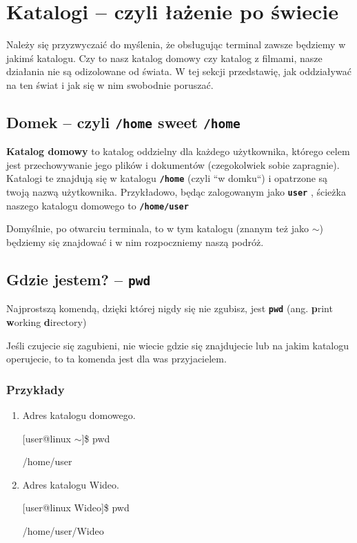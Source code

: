 \documentclass[11pt, a4paper]{article}
\makeatletter
\newcommand{\ttbf}[1]{
    \texttt{\textbf{#1}}
}
\newenvironment{console1}[1][$\sim$]
{
    \begin{tcolorbox}
    \ttfamily
    \fontseries{b}
    \selectfont
    {[}user@linux #1{]}\$ } {
    
    \end{tcolorbox}

}
\makeatother
\begin{document}
\section{Katalogi -- czyli łażenie po świecie}

Należy się przyzwyczaić do myślenia, że obsługując terminal zawsze będziemy w jakimś katalogu. Czy to nasz katalog domowy czy katalog z filmami, nasze działania nie są odizolowane od świata. W tej sekcji przedstawię, jak oddziaływać na ten świat i jak się w nim swobodnie poruszać.

\subsection{Domek -- czyli \ttbf{/home} sweet \ttbf{/home}}
\label{sec:homedir}

\textbf{Katalog domowy} to katalog oddzielny dla każdego użytkownika, którego celem jest przechowywanie jego plików i dokumentów (czegokolwiek sobie zapragnie). Katalogi te znajdują się w katalogu \ttbf{/home} (czyli ``w domku``) i opatrzone są twoją nazwą użytkownika. Przykładowo, będąc zalogowanym jako \ttbf{user}, ścieżka naszego katalogu domowego to \ttbf{/home/user}

Domyślnie, po otwarciu terminala, to w tym katalogu (znanym też jako $\sim$) będziemy się znajdować i w nim rozpoczniemy naszą podróż.

\subsection{Gdzie jestem? -- \ttbf{pwd}}

Najprostszą komendą, dzięki której nigdy się nie zgubisz, jest \ttbf{pwd} (ang. \textbf{p}rint \textbf{w}orking \textbf{d}irectory)

Jeśli czujecie się zagubieni, nie wiecie gdzie się znajdujecie lub na jakim katalogu operujecie, to ta komenda jest dla was przyjacielem.

\subsubsection{Przykłady}

\begin{enumerate}
    \item Adres katalogu domowego.
    \begin{console1}
    pwd

    /home/user
    \end{console1}

    \item Adres katalogu Wideo.
    \begin{console1}[Wideo]
    pwd

    /home/user/Wideo
    \end{console1}
    
\end{enumerate}
\end{document}
